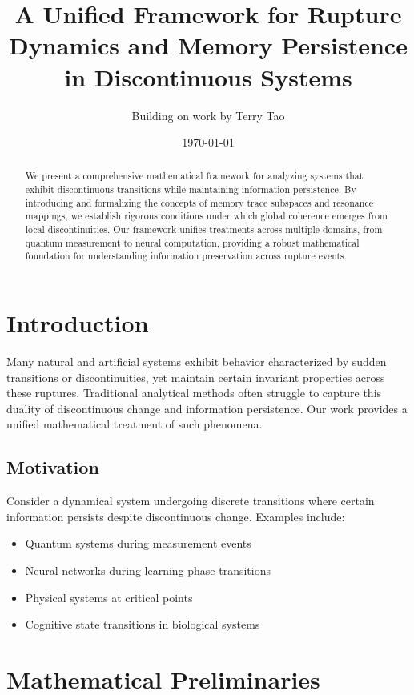 \documentclass[12pt]{article}
\title{A Unified Framework for Rupture Dynamics and Memory Persistence in Discontinuous Systems}
\author{Building on work by Terry Tao}
\date{\today}
\theoremstyle{definition}
\theoremstyle{plain}
\begin{document}
\maketitle

\begin{abstract}
We present a comprehensive mathematical framework for analyzing systems that exhibit discontinuous transitions while maintaining information persistence. By introducing and formalizing the concepts of memory trace subspaces and resonance mappings, we establish rigorous conditions under which global coherence emerges from local discontinuities. Our framework unifies treatments across multiple domains, from quantum measurement to neural computation, providing a robust mathematical foundation for understanding information preservation across rupture events.
\end{abstract}

\section{Introduction}

Many natural and artificial systems exhibit behavior characterized by sudden transitions or discontinuities, yet maintain certain invariant properties across these ruptures. Traditional analytical methods often struggle to capture this duality of discontinuous change and information persistence. Our work provides a unified mathematical treatment of such phenomena.

\subsection{Motivation}

Consider a dynamical system undergoing discrete transitions where certain information persists despite discontinuous change. Examples include:
\begin{itemize}
    \item Quantum systems during measurement events
    \item Neural networks during learning phase transitions
    \item Physical systems at critical points
    \item Cognitive state transitions in biological systems
\end{itemize}

\section{Mathematical Preliminaries}
\end{document}
